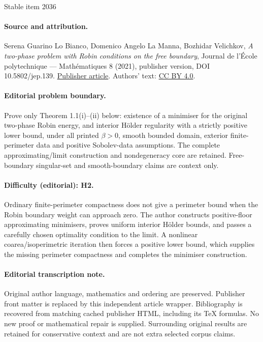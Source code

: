 \documentclass[11pt]{article}
\numberwithin{equation}{section}
\theoremstyle{plain}
\theoremstyle{definition}
\begin{document}
\begin{center}{\Large Stable item 2036}\end{center}
\paragraph{Source and attribution.}
Serena Guarino Lo Bianco, Domenico Angelo La Manna, Bozhidar Velichkov, \emph{A two-phase problem with Robin conditions on the free boundary}, Journal de l’École polytechnique — Mathématiques 8 (2021), publisher version, DOI 10.5802/jep.139. \href{https://jep.centre-mersenne.org/articles/10.5802/jep.139/}{Publisher article}. Authors' text: \href{https://creativecommons.org/licenses/by/4.0/}{CC BY 4.0}.
\paragraph{Editorial problem boundary.}
Prove only Theorem 1.1(i)--(ii) below: existence of a minimiser for the original two-phase Robin energy, and interior Hölder regularity with a strictly positive lower bound, under all printed \(\beta>0\), smooth bounded domain, exterior finite-perimeter data and positive Sobolev-data assumptions. The complete approximating/limit construction and nondegeneracy core are retained. Free-boundary singular-set and smooth-boundary claims are context only.
\paragraph{Difficulty (editorial): H2.}
Ordinary finite-perimeter compactness does not give a perimeter bound when the Robin boundary weight can approach zero. The author constructs positive-floor approximating minimisers, proves uniform interior Hölder bounds, and passes a carefully chosen optimality condition to the limit. A nonlinear coarea/isoperimetric iteration then forces a positive lower bound, which supplies the missing perimeter compactness and completes the minimiser construction.
\paragraph{Editorial transcription note.}
Original author language, mathematics and ordering are preserved. Publisher front matter is replaced by this independent article wrapper. Bibliography is recovered from matching cached publisher HTML, including its TeX formulas. No new proof or mathematical repair is supplied. Surrounding original results are retained for conservative context and are not extra selected corpus claims.
\clearpage
\end{document}
